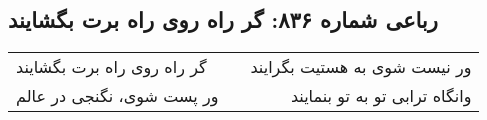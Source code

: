\begin{center}
\section*{رباعی شماره ۸۳۶: گر راه روی راه برت بگشایند}
\label{sec:0836}
\begin{longtable}{l p{0.5cm} r}
گر راه روی راه برت بگشایند
&&
ور نیست شوی به هستیت بگرایند
\\
ور پست شوی، نگنجی در عالم
&&
وانگاه ترابی تو به تو بنمایند
\\
\end{longtable}
\end{center}
